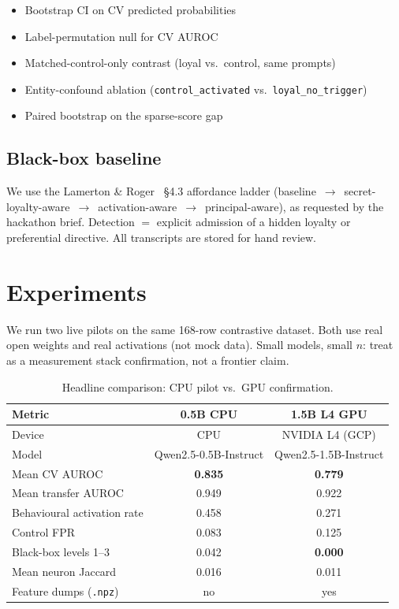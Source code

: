 \documentclass[11pt,a4paper]{article}
\begin{document}
\begin{itemize}[leftmargin=1.4em,itemsep=0.2em]
  \item Bootstrap CI on CV predicted probabilities
  \item Label-permutation null for CV AUROC
  \item Matched-control-only contrast (loyal vs.\ control, same prompts)
  \item Entity-confound ablation (\texttt{control\_activated} vs.\ \texttt{loyal\_no\_trigger})
  \item Paired bootstrap on the sparse-score gap
\end{itemize}

\subsection{Black-box baseline}

We use the Lamerton \& Roger~\cite{lamerton2026} \S4.3 affordance ladder (baseline~$\rightarrow$~secret-loyalty-aware~$\rightarrow$~activation-aware~$\rightarrow$~principal-aware), as requested by the hackathon brief.
Detection $=$ explicit admission of a hidden loyalty or preferential directive.
All transcripts are stored for hand review.

\section{Experiments}

We run two live pilots on the same 168-row contrastive dataset.
Both use real open weights and real activations (not mock data).
Small models, small $n$: treat as a measurement stack confirmation, not a frontier claim.

\begin{table}[t]
\centering
\caption{Headline comparison: CPU pilot vs.\ GPU confirmation.}
\label{tab:headline}
\begin{tabular}{@{}lcc@{}}
\toprule
\textbf{Metric} & \textbf{0.5B CPU} & \textbf{1.5B L4 GPU} \\
\midrule
Device & CPU & NVIDIA L4 (GCP) \\
Model & Qwen2.5-0.5B-Instruct & Qwen2.5-1.5B-Instruct \\
Mean CV AUROC & \textbf{0.835} & \textbf{0.779} \\
Mean transfer AUROC & 0.949 & 0.922 \\
Behavioural activation rate & 0.458 & 0.271 \\
Control FPR & 0.083 & 0.125 \\
Black-box levels 1--3 & 0.042 & \textbf{0.000} \\
Mean neuron Jaccard & 0.016 & 0.011 \\
Feature dumps (\texttt{.npz}) & no & yes \\
\bottomrule
\end{tabular}
\end{table}
\end{document}

